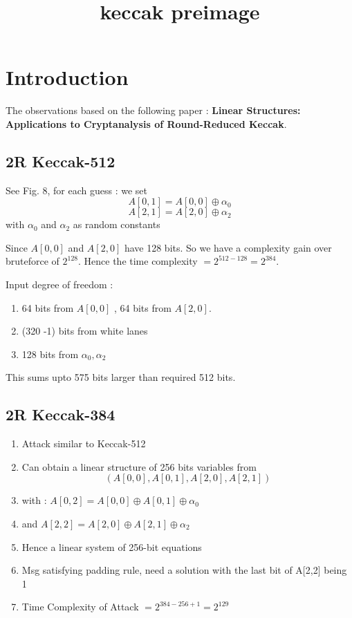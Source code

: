 \documentclass{article}
\title{keccak preimage}
\begin{document}
\maketitle

\section{Introduction}

The observations based on the following paper : \textbf{Linear Structures: Applications to Cryptanalysis of Round-Reduced Keccak}.

\subsection{2R Keccak-512}

See Fig. 8, for each guess :
we set 
\[
    A[0, 1] = A[0, 0] \oplus \alpha_{0}
\]
\[
    A[2, 1] = A[2, 0] \oplus \alpha_{2}
\]
with $\alpha_0$ and $\alpha_2$ as random constants

Since $A[0,0]$ and $A[2,0]$ have 128 bits. So we have a complexity gain over bruteforce of $2^{128}$. Hence the time complexity $= 2^{512 - 128} = 2^{384}$.

Input degree of freedom : 
\begin{enumerate}
    \item 64 bits from $A[0, 0]$ , 64 bits from $A[2,0]$.
    \item (320 -1) bits from white lanes
    \item 128 bits from $\alpha_0, \alpha_2$
\end{enumerate}

This sums upto 575 bits larger than required 512 bits.

\subsection{2R Keccak-384}

\begin{enumerate}
    \item Attack similar to Keccak-512
    \item Can obtain a linear structure of 256 bits variables from 
    \[
        (A[0, 0], A[0, 1], A[2, 0], A[2, 1])
    \]
    
    \item with : $A[0, 2] = A[0, 0] \oplus A[0, 1] \oplus \alpha_0$
    \item and $A[2, 2] = A[2, 0] \oplus A[2, 1] \oplus \alpha_2$
    \item Hence a linear system of 256-bit equations
    \item Msg satisfying padding rule, need a solution with the last bit of A[2,2] being 1
    \item Time Complexity of Attack $ = 2^{384 - 256 + 1} = 2^{129}$
\end{enumerate}
\end{document}
